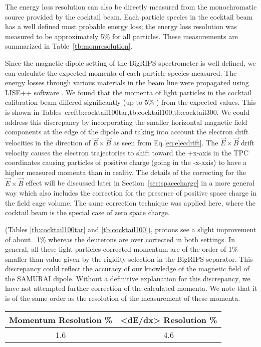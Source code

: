The energy loss resolution can also be directly measured from the monochromatic source provided by the cocktail beam. Each particle species in the cocktail beam has a well defined most probable energy loss;  the energy loss resolution was measured to be approximately 5\% for all particles. These measurements are summarized in Table~\ref{tb:momresolution}.

Since the magnetic dipole setting of the BigRIPS spectrometer is well defined, we can calculate the expected momenta of each particle species measured. The energy losses through various materials in the beam line were propagated using LISE++ software \cite{lise++}. We found that the momenta of light particles in the  cocktail calibration beam differed significantly (up to 5\% ) from the expected values. This is shown in Tables~cref{tb:cocktail100tar,tb:cocktail100,tb:cocktail300}. We could address this discrepancy by incorporating the smaller horizontal magnetic field components at the edge of the dipole and taking into account the electron drift velocities in the direction of $\vec{E}\times\vec{B}$ as seen from Eq.\ref{eq:elecdrift}. The $\vec{E}\times\vec{B}$ drift velocity causes the electron trajectories to shift toward the +x-axis in the TPC coordinates causing particles of positive charge (going in the -x-axis) to have a higher measured momenta than in reality.  The details of the correcting for the $\vec{E}\times\vec{B}$ effect will be discussed later in Section~\ref{sec:spacecharge} in a more general way which also includes the correction for the presence of positive space charge in the field cage volume. The same correction technique was applied here, where the cocktail beam is the special case of zero space charge.

(Tables \ref{tb:cocktail100tar} and \ref{tb:cocktail100}), protons see a slight improvement of about ~1\% whereas the deuterons are over corrected in both settings. In general, all these light particles corrected momentum are of the order of 1\% smaller than value given by the rigidity selection in the BigRIPS separator. This discrepancy could reflect the accuracy of our knowledge of the magnetic field of the SAMURAI dipole. Without a definitive explanation for this discrepancy, we have not attempted further correction of the calculated momenta. We note that it is of the same order as the resolution of the measurement of these momenta.  

\begin{table*}\centering
{}
\begin{tabular}{@{}cc@{}}\toprule
Momentum Resolution \% & <dE/dx> Resolution \% \\
\midrule
1.6  & 4.6\\
\bottomrule
\end{tabular}
\caption{Summary of the estimated momentum and energy loss resolutions.}
\label{tb:momresolution}
\end{table*}

